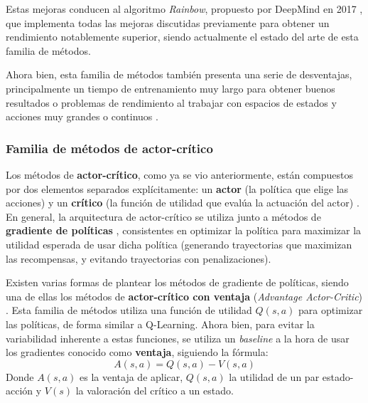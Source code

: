 Estas mejoras conducen al algoritmo \textit{Rainbow}, propuesto por DeepMind en 2017 \cite{DBLP:journals/corr/abs-1710-02298}, que implementa todas las mejoras discutidas previamente para obtener un rendimiento notablemente superior, siendo actualmente el estado del arte de esta familia de métodos.

Ahora bien, esta familia de métodos también presenta una serie de desventajas, principalmente un tiempo de entrenamiento muy largo para obtener buenos resultados \cite{10.5555/3161223} o problemas de rendimiento al trabajar con espacios de estados y acciones muy grandes o continuos \cite{DBLP:journals/corr/abs-1811-12560}.

\subsubsection{Familia de métodos de actor-crítico}

Los métodos de \textbf{actor-crítico}, como ya se vio anteriormente, están compuestos por dos elementos separados explícitamente: un \textbf{actor} (la política que elige las acciones) y un \textbf{crítico} (la función de utilidad que evalúa la actuación del actor) \cite{Sutton1998}. En general, la arquitectura de actor-crítico se utiliza junto a métodos de \textbf{gradiente de políticas} \cite{PETERS2008682}, consistentes en optimizar la política para maximizar la utilidad esperada de usar dicha política (generando trayectorias que maximizan las recompensas, y evitando trayectorias con penalizaciones). 

Existen varias formas de plantear los métodos de gradiente de políticas, siendo una de ellas los métodos de \textbf{actor-crítico con ventaja} (\textit{Advantage Actor-Critic}) \cite{DBLP:journals/corr/MnihBMGLHSK16}. Esta familia de métodos utiliza una función de utilidad $Q(s,a)$ para optimizar las políticas, de forma similar a Q-Learning. Ahora bien, para evitar la variabilidad inherente a estas funciones, se utiliza un \textit{baseline} a la hora de usar los gradientes conocido como \textbf{ventaja}, siguiendo la fórmula:
\[A(s,a)=Q(s,a)-V(s,a)\]
Donde $A(s,a)$ es la ventaja de aplicar, $Q(s,a)$ la utilidad de un par estado-acción y $V(s)$ la valoración del crítico a un estado.

